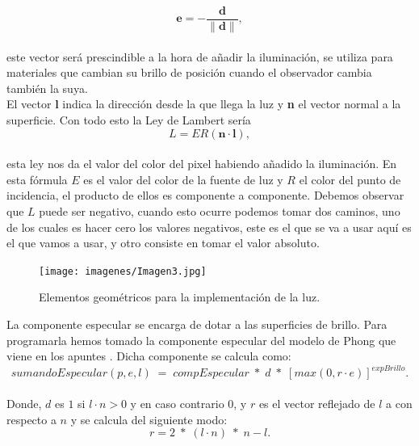 
\[
	\textbf{e} = - \frac{\textbf{d}}{\|\textbf{d}\|},
\]
${ }$\\
este vector será prescindible a la hora de añadir la iluminación, se utiliza para materiales que cambian su brillo de posición cuando el observador cambia también la suya.
${ }$\\


El vector \textbf{l} indica la dirección desde la que llega la luz y \textbf{n} el vector normal a la superficie. Con todo esto la Ley de Lambert sería
${ }$\\
\[
	L = ER(\textbf{n}\cdot \textbf{l}),
\]
${ }$\\
esta ley nos da el valor del color del pixel habiendo añadido la iluminación. En esta fórmula $E$ es el valor del color de la fuente de luz y $R$ el color del punto de incidencia, el producto de ellos es componente a componente. Debemos observar que $L$ puede ser negativo, cuando esto ocurre podemos tomar dos caminos, uno de los cuales es hacer cero los valores negativos, este es el que se va a usar aquí es el que vamos a usar, y otro consiste en tomar el valor absoluto.
	${ }$\\	


\begin{figure}[h]
	\begin{center}
		\texttt{[image: imagenes/Imagen3.jpg]}
	\end{center}
	\caption{Elementos geométricos para la implementación de la luz.}
	\label{fig:etiq_5}
\end{figure}

La componente especular se encarga de dotar a las superficies de brillo. Para programarla hemos tomado la componente especular del modelo de Phong que viene en los apuntes \cite{carlosU}. Dicha componente se calcula como:
${ }$\\

$$ sumandoEspecular(p, e, l) \; = \; compEspecular \; * \; d \; * \; [max(0, r \cdot e)]^{expBrillo}.$$
${ }$\\

Donde, $d$ es $1$ si $l	\cdot n > 0$ y en caso contrario $0$, y $r$ es el vector reflejado de $l$ a con respecto a $n$ y se calcula del siguiente modo:
${ }$\\

$$r = 2 \; * \; (l \cdot n) \; * \; n - l. $$
${ }$\\


